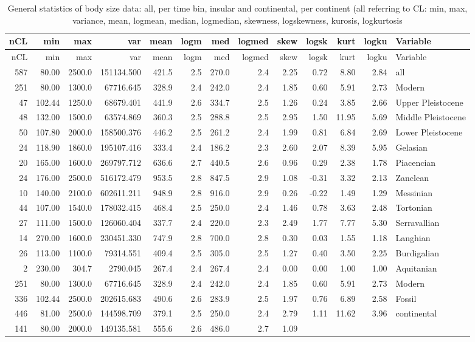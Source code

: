 \documentclass[]{article}
\begin{document}
\begin{longtable}[]{@{}rrrrrrrrrrrrl@{}}
\caption{General statistics of body size data: all, per time bin,
insular and continental, per continent (all referring to CL: min, max,
variance, mean, logmean, median, logmedian, skewness, logskewness,
kurosis, logkurtosis}\tabularnewline
\toprule
nCL & min & max & var & mean & logm & med & logmed & skew & logsk & kurt
& logku & Variable\tabularnewline
\midrule
\endfirsthead
\toprule
nCL & min & max & var & mean & logm & med & logmed & skew & logsk & kurt
& logku & Variable\tabularnewline
\midrule
\endhead
587 & 80.00 & 2500.0 & 151134.500 & 421.5 & 2.5 & 270.0 & 2.4 & 2.25 &
0.72 & 8.80 & 2.84 & all\tabularnewline
251 & 80.00 & 1300.0 & 67716.645 & 328.9 & 2.4 & 242.0 & 2.4 & 1.85 &
0.60 & 5.91 & 2.73 & Modern\tabularnewline
47 & 102.44 & 1250.0 & 68679.401 & 441.9 & 2.6 & 334.7 & 2.5 & 1.26 &
0.24 & 3.85 & 2.66 & Upper Pleistocene\tabularnewline
48 & 132.00 & 1500.0 & 63574.869 & 360.3 & 2.5 & 288.8 & 2.5 & 2.95 &
1.50 & 11.95 & 5.69 & Middle Pleistocene\tabularnewline
50 & 107.80 & 2000.0 & 158500.376 & 446.2 & 2.5 & 261.2 & 2.4 & 1.99 &
0.81 & 6.84 & 2.69 & Lower Pleistocene\tabularnewline
24 & 118.90 & 1860.0 & 195107.416 & 333.4 & 2.4 & 186.2 & 2.3 & 2.60 &
2.07 & 8.39 & 5.95 & Gelasian\tabularnewline
20 & 165.00 & 1600.0 & 269797.712 & 636.6 & 2.7 & 440.5 & 2.6 & 0.96 &
0.29 & 2.38 & 1.78 & Piacencian\tabularnewline
24 & 176.00 & 2500.0 & 516172.479 & 953.5 & 2.8 & 847.5 & 2.9 & 1.08 &
-0.31 & 3.32 & 2.13 & Zanclean\tabularnewline
10 & 140.00 & 2100.0 & 602611.211 & 948.9 & 2.8 & 916.0 & 2.9 & 0.26 &
-0.22 & 1.49 & 1.29 & Messinian\tabularnewline
44 & 107.00 & 1540.0 & 178032.415 & 468.4 & 2.5 & 250.0 & 2.4 & 1.46 &
0.78 & 3.63 & 2.48 & Tortonian\tabularnewline
27 & 111.00 & 1500.0 & 126060.404 & 337.7 & 2.4 & 220.0 & 2.3 & 2.49 &
1.77 & 7.77 & 5.30 & Serravallian\tabularnewline
14 & 270.00 & 1600.0 & 230451.330 & 747.9 & 2.8 & 700.0 & 2.8 & 0.30 &
0.03 & 1.55 & 1.18 & Langhian\tabularnewline
26 & 113.00 & 1100.0 & 79314.551 & 409.4 & 2.5 & 305.0 & 2.5 & 1.27 &
0.40 & 3.50 & 2.25 & Burdigalian\tabularnewline
2 & 230.00 & 304.7 & 2790.045 & 267.4 & 2.4 & 267.4 & 2.4 & 0.00 & 0.00
& 1.00 & 1.00 & Aquitanian\tabularnewline
251 & 80.00 & 1300.0 & 67716.645 & 328.9 & 2.4 & 242.0 & 2.4 & 1.85 &
0.60 & 5.91 & 2.73 & Modern\tabularnewline
336 & 102.44 & 2500.0 & 202615.683 & 490.6 & 2.6 & 283.9 & 2.5 & 1.97 &
0.76 & 6.89 & 2.58 & Fossil\tabularnewline
446 & 81.00 & 2500.0 & 144598.709 & 379.1 & 2.5 & 250.0 & 2.4 & 2.79 &
1.11 & 11.62 & 3.96 & continental\tabularnewline
141 & 80.00 & 2000.0 & 149135.581 & 555.6 & 2.6 & 486.0 & 2.7 & 1.09 &

\end{longtable}
\end{document}
